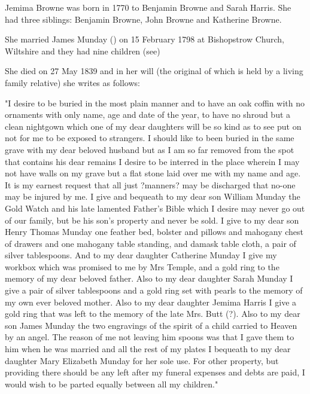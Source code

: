 
Jemima Browne was born in	1770 	to Benjamin Browne and Sarah Harris. She had three siblings: Benjamin Browne, John Browne and Katherine Browne.

She married James Munday () on 15 February 1798 at Bishopstrow Church, Wiltshire and they had nine children (see)

She died on 	27 May 1839 and in her will (the original of which is held by a living family relative) she writes as follows:

"I desire to be buried in the most plain manner and to have an oak coffin with no ornaments with only name, age and date of the year, to have no shroud but a clean nightgown which one of my dear daughters will be so kind as to see put on not for me to be exposed to strangers. I should like to been buried in the same grave with my dear beloved husband but as I am so far removed from the spot that contains his dear remains I desire to be interred in the place wherein I may not have walls on my grave but a flat stone laid over me with my name and age. It is my earnest request that all just ?manners? may be discharged that no-one may be injured by me. I give and bequeath to my dear son William Munday the Gold Watch and his late lamented Father's Bible which I desire may never go out of our family, but be his son's property and never be sold. I give to my dear son Henry Thomas Munday one feather bed, bolster and pillows and mahogany chest of drawers and one mahogany table standing, and damask table cloth, a pair of silver tablespoons. And to my dear daughter Catherine Munday I give my workbox which was promised to me by Mrs Temple, and a gold ring to the memory of my dear beloved father. Also to my dear daughter Sarah Munday I give a pair of silver tablespoons and a gold ring set with pearls to the memory of my own ever beloved mother. Also to my dear daughter Jemima Harris I give a gold ring that was left to the memory of the late Mrs. Butt (?). Also to my dear son James Munday the two engravings of the spirit of a child carried to Heaven by an angel. The reason of me not leaving him spoons was that I gave them to him when he was married and all the rest of my plates I bequeath to my dear daughter Mary Elizabeth Munday for her sole use. For other property, but providing there should be any left after my funeral expenses and debts are paid, I would wish to be parted equally between all my children."
